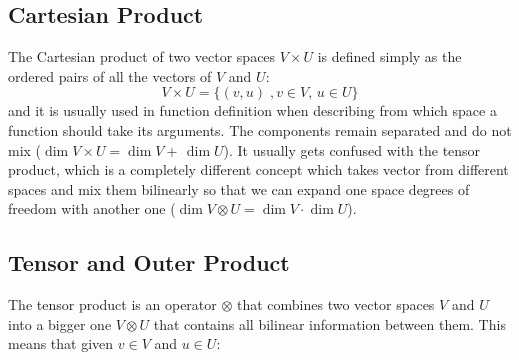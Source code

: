 \documentclass[12pt,a4paper]{article}
\begin{document}
\subsection{Cartesian Product}
The Cartesian product of two vector spaces $V\times U$ is defined simply as the ordered pairs of all the vectors of $V$ and $U$:
\begin{equation*}
	V\times U = \{(v,u) \;, v \in V, \, u\in U\}
\end{equation*}
and it is usually used in function definition when describing from which space a function should take its arguments.
The components remain separated and do not mix ($\dim{V\times U} = \dim{V} + \, \dim{U}$). It usually gets confused with the tensor product, which is a completely different concept which takes vector from different spaces and mix them bilinearly so that we can expand one space degrees of freedom with another one ($\dim{V\otimes U} = \dim{V}\cdot \dim{U}$).

\subsection{Tensor and Outer Product}
The tensor product is an operator $\otimes$ that combines two vector spaces $V$ and $U$ into a bigger one $V\otimes U$ that contains all bilinear information between them. This means that given $v\in V$ and $u\in U$:
\end{document}
